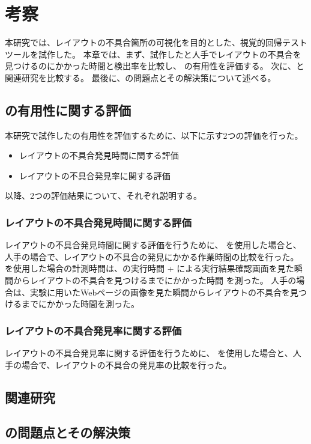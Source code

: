 \chapter{考察}\label{cha:Discussion}
本研究では、レイアウトの不具合箇所の可視化を目的とした、視覚的回帰テストツール\toolName を試作した。
本章では、まず、試作した\toolName と人手でレイアウトの不具合を見つけるのにかかった時間と検出率を比較し、
\toolName の有用性を評価する。
次に、\toolName と関連研究を比較する。
最後に、\toolName の問題点とその解決策について述べる。


\section{\toolName の有用性に関する評価}\label{sec:evalue_usefulness}
本研究で試作した\toolName の有用性を評価するために、以下に示す2つの評価を行った。
\begin{itemize}
    \item レイアウトの不具合発見時間に関する評価
    \item レイアウトの不具合発見率に関する評価
\end{itemize}
以降、2つの評価結果について、それぞれ説明する。


\subsection{レイアウトの不具合発見時間に関する評価}\label{subsec:evalue_required_time}
レイアウトの不具合発見時間に関する評価を行うために、
\toolName を使用した場合と、人手の場合で、レイアウトの不具合の発見にかかる作業時間の比較を行った。
\toolName を使用した場合の計測時間は、\toolName の実行時間 + \toolName による実行結果確認画面を見た瞬間からレイアウトの不具合を見つけるまでにかかった時間 を測った。
人手の場合は、実験に用いたWebページの画像を見た瞬間からレイアウトの不具合を見つけるまでにかかった時間を測った。

\subsection{レイアウトの不具合発見率に関する評価}\label{subsec:evalue_accuracy}
レイアウトの不具合発見率に関する評価を行うために、
\toolName を使用した場合と、人手の場合で、レイアウトの不具合の発見率の比較を行った。



\section{関連研究}\label{sec:relation_research}



\section{\toolName の問題点とその解決策}\label{sec:AWSEL_problems}